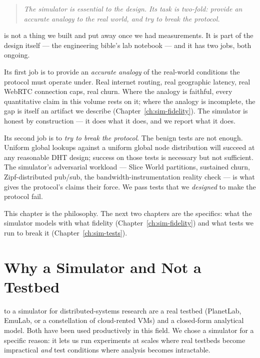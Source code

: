 \documentclass[twoside,nobib]{tufte-book}
\begin{document}
\begin{quote}
  \itshape The simulator is essential to the design.
  Its task is two-fold: provide an accurate analogy to the real
  world, and try to break the protocol.
\end{quote}

 is not a thing we built and put away
once we had measurements. It is part of the design itself --- the
engineering bible's lab notebook --- and it has two jobs, both
ongoing.

Its first job is to provide an \emph{accurate analogy} of the
real-world conditions the protocol must operate under. Real
internet routing, real geographic latency, real WebRTC
connection caps, real churn. Where the analogy is faithful, every
quantitative claim in this volume rests on it; where the analogy
is incomplete, the gap is itself an artifact we describe
(Chapter~\ref{ch:sim-fidelity}). The simulator is honest by
construction --- it does what it does, and we report what it does.

Its second job is to \emph{try to break the protocol}. The
benign tests are not enough. Uniform global lookups against a
uniform global node distribution will succeed at any reasonable
DHT design; success on those tests is necessary but not
sufficient. The simulator's adversarial workload --- Slice World
partitions, sustained churn, Zipf-distributed pub/sub, the
bandwidth-instrumentation reality check --- is what gives the
protocol's claims their force. We pass tests that we
\emph{designed} to make the protocol fail.

This chapter is the philosophy. The next two chapters are the
specifics: what the simulator models with what fidelity
(Chapter~\ref{ch:sim-fidelity}) and what tests we run to break it
(Chapter~\ref{ch:sim-tests}).

\section{Why a Simulator and Not a Testbed}

 to a simulator for
distributed-systems research are a real testbed (PlanetLab,
EmuLab, or a constellation of cloud-rented VMs) and a closed-form
analytical model. Both have been used productively in this field.
We chose a simulator for a specific reason: it lets us run
experiments at scales where real testbeds become impractical
\emph{and} test conditions where analysis becomes intractable.
\end{document}

